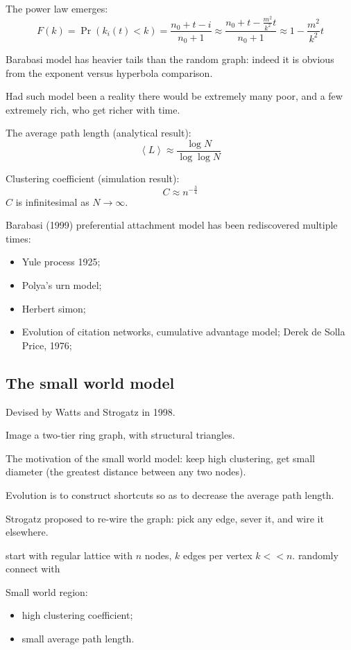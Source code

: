 \documentclass[a4paper]{article}
\newcommand{\brac}[1]{{\left ( #1 \right )}}
\newcommand{\brkt}[1]{{\left\langle #1 \right\rangle}}
\begin{document}
The power law emerges:
\[F(k) = \Pr\brac{k_i(t)<k} = \frac{n_0+t-i}{n_0+1} \approx \frac{n_0+t-\frac{m^2}{k^2} t}{n_0+1} \approx 1 - \frac{m^2}{k^2} t\]


Barabasi model has heavier tails than the random graph: indeed it is obvious from the exponent versus hyperbola comparison.

Had such model been a reality there would be extremely many poor, and a few extremely rich, who get richer with time.

The average path length (analytical result):
\[\brkt{L}\approx \frac{\log N}{\log\log N}\]

Clustering coefficient (simulation result):
\[C\approx n^{-\frac{3}{4}}\]
$C$ is infinitesimal as $N\to \infty$.

Barabasi (1999) preferential attachment model has been rediscovered multiple times:
\begin{itemize}
	\item Yule process 1925;
	\item Polya's urn model;
	\item Herbert simon;
	\item Evolution of citation networks, cumulative advantage model; Derek de Solla Price, 1976;
\end{itemize}

\subsection{The small world model} %
\label{sub:the_small_world_model}

Devised by Watts and Strogatz in 1998.

Image a two-tier ring graph, with structural triangles.

The motivation of the small world model: keep high clustering, get small diameter (the greatest distance between any two nodes).

Evolution is to construct shortcuts so as to decrease the average path length.

Strogatz proposed to re-wire the graph: pick any edge, sever it, and wire it elsewhere.

start with regular lattice with $n$ nodes, $k$ edges per vertex $k<<n$.
randomly connect with 

Small world region:
\begin{itemize}
	\item high clustering coefficient;
	\item small average path length.
\end{itemize}
\end{document}
